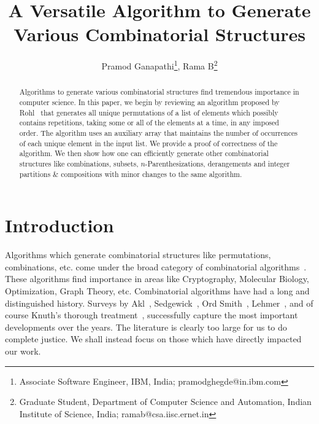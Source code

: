 \documentclass{article}
\title{A Versatile Algorithm to Generate Various Combinatorial Structures}
\author{Pramod Ganapathi\thanks{Associate Software Engineer, IBM, India; pramodghegde@in.ibm.com}, Rama B\thanks{Graduate Student, Department of Computer Science and Automation, Indian Institute of Science, India; ramab@csa.iisc.ernet.in}}
\begin{document}
\thispagestyle{empty}

\label{firstpage}
\maketitle 
\begin{abstract}
Algorithms to generate various combinatorial structures find tremendous importance in computer science. In this paper, we begin by reviewing an algorithm proposed by Rohl~\cite{rohl1} that generates all unique permutations of a list of elements which possibly contains repetitions, taking some or all of the elements at a time, in any imposed order. The algorithm uses an auxiliary array that maintains the number of occurrences of each unique element in the input list. We provide a proof of correctness of the algorithm. We then show how one can efficiently generate other combinatorial structures like combinations, subsets, $n$-Parenthesizations, derangements and integer partitions \& compositions with minor changes to the same algorithm.
\end{abstract}


\section{Introduction}
\label{sec:intro}

Algorithms which generate combinatorial structures like permutations, combinations, etc. come under the broad category of combinatorial algorithms~\cite{book_KrSt}. These algorithms find importance in areas like Cryptography, Molecular Biology, Optimization, Graph Theory, etc. Combinatorial algorithms have had a long and distinguished history. Surveys by Akl~\cite{selim_combsurvey}, Sedgewick~\cite{sedgewick_perm}, Ord Smith~\cite{ordsmith_1,ordsmith_2}, Lehmer~\cite{lehmer_tricks}, and of course Knuth's thorough treatment~\cite{knuth_perm,knuth_fas3}, successfully capture the most important developments over the years. The literature is clearly too large for us to do complete justice. We shall instead focus on those which have directly impacted our work.
\end{document}
